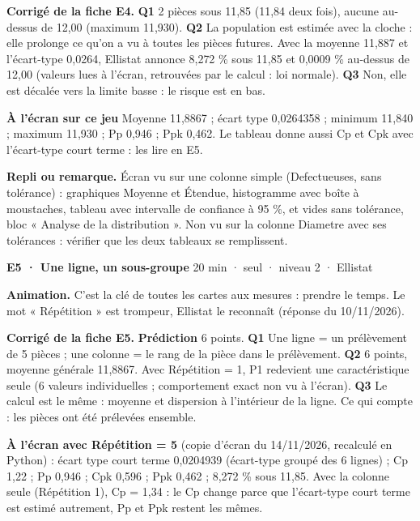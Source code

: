 \textbf{\color{ok}Corrigé de la fiche E4.} \textbf{Q1} 2 pièces sous 11,85 (11,84 deux fois), aucune au-dessus de 12,00 (maximum 11,930). \textbf{Q2} La population est estimée avec la cloche : elle prolonge ce qu'on a vu à toutes les pièces futures. Avec la moyenne 11,887 et l'écart-type 0,0264, Ellistat annonce 8,272 \% sous 11,85 et 0,0009 \% au-dessus de 12,00 (valeurs lues à l'écran, retrouvées par le calcul : loi normale). \textbf{Q3} Non, elle est décalée vers la limite basse : le risque est en bas.\par \textbf{À l'écran sur ce jeu} Moyenne 11,8867 ; écart type 0,0264358 ; minimum 11,840 ; maximum 11,930 ; Pp 0,946 ; Ppk 0,462. Le tableau  donne aussi Cp et Cpk avec l'écart-type court terme : les lire en E5.\par
{\small\textbf{Repli ou remarque.} Écran  vu sur une colonne simple (Defectueuses, sans tolérance) : graphiques Moyenne et Étendue, histogramme avec boîte à moustaches, tableau  avec intervalle de confiance à 95 \%,  et  vides sans tolérance, bloc « Analyse de la distribution ». Non vu sur la colonne Diametre avec ses tolérances : vérifier que les deux tableaux se remplissent.}\par
\vspace{3pt}
\begin{tcolorbox}[act]\textbf{E5 · Une ligne, un sous-groupe} \hfill {\small 20 min · seul · niveau 2 · Ellistat}\end{tcolorbox}
\textbf{Animation.} C'est la clé de toutes les cartes aux mesures : prendre le temps. Le mot « Répétition » est trompeur, Ellistat le reconnaît (réponse du 10/11/2026).\par
\textbf{\color{ok}Corrigé de la fiche E5.} \textbf{Prédiction} 6 points. \textbf{Q1} Une ligne = un prélèvement de 5 pièces ; une colonne = le rang de la pièce dans le prélèvement. \textbf{Q2} 6 points, moyenne générale 11,8867. Avec Répétition = 1, P1 redevient une caractéristique seule (6 valeurs individuelles ; comportement exact non vu à l'écran). \textbf{Q3} Le calcul est le même : moyenne et dispersion à l'intérieur de la ligne. Ce qui compte : les pièces ont été prélevées ensemble.\par \textbf{À l'écran avec Répétition = 5} (copie d'écran du 14/11/2026, recalculé en Python) : écart type court terme 0,0204939 (écart-type groupé des 6 lignes) ; Cp 1,22 ; Pp 0,946 ; Cpk 0,596 ; Ppk 0,462 ; 8,272 \% sous 11,85. Avec la colonne seule (Répétition 1), Cp = 1,34 : le Cp change parce que l'écart-type court terme est estimé autrement, Pp et Ppk restent les mêmes.\par
